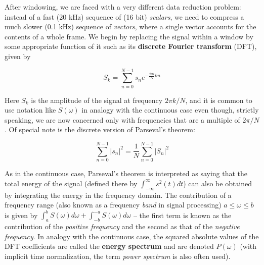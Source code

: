 \smallskip
\noindent
After windowing, we are faced with a very different data reduction problem:
instead of a fast (20 kHz) sequence of (16 bit) {\it scalars}, we need to
compress a much slower (0.1 kHz) sequence of {\it vectors}, where a single
vector accounts for the contents of a whole frame. We begin by replacing the
signal within a window by some appropriate function of it such as its {\bf
  discrete Fourier transform} (DFT),
given by

\begin{equation}
S_k=\sum_{n=0}^{N-1}s_ne^{-\frac{2\pi i}{N} kn}
\end{equation}

\noindent
Here $S_k$ is the amplitude of the signal at frequency $2\pi k/N$, and it is
common to use notation like $S(\omega)$ in analogy with the continuous case
even though, strictly speaking, we are now concerned only with frequencies
that are a multiple of $2\pi/N$. Of special note is the discrete version of 
Parseval's theorem: 

\begin{equation}
\sum_{n=0}^{N-1}|s_n|^2 = \frac{1}{N} \sum_{n=0}^{N-1}|S_n|^2 
\end{equation}

\noindent
As in the continuous case, Parseval's theorem is interpreted as saying that
the total energy of the signal (defined there by $\int_{-\infty}^{\infty}
s^2(t)dt$) can also be obtained by integrating the energy in the frequency
domain. The contribution of a frequency range (also known as a frequency {\it
  band} in signal processing) $a \leq \omega \leq b$ is given by $\int_a^b
S(\omega)d\omega +\int_{-b}^{-a}S(\omega)d\omega$ -- the first term is known
as the contribution of the {\it positive frequency} and the second as that of
the {\it negative frequency}. In analogy with the continuous case, the squared
absolute values of the DFT coefficients are called the {\bf energy spectrum}
and are denoted $P(\omega)$ (with implicit time normalization, the term {\it
  power spectrum} is also often used).

